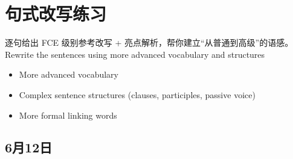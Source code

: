 
\chapter{句式改写练习}

逐句给出 FCE 级别参考改写 + 亮点解析，帮你建立“从普通到高级”的语感。Rewrite the sentences using more advanced vocabulary and structures


\begin{itemize}
  \item More advanced vocabulary
  \item Complex sentence structures (clauses, participles, passive voice)
  \item More formal linking words
\end{itemize}


\section{6月12日}


\bigskip

